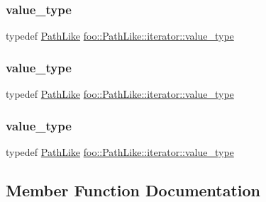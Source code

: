 \subsubsection{\texorpdfstring{value\_type}{value\_type}\hspace{0.1cm}{\footnotesize\ttfamily [1/3]}}
{\footnotesize\ttfamily typedef \mbox{\hyperlink{classfoo_1_1_path_like}{Path\+Like}} \mbox{\hyperlink{structfoo_1_1_path_like_1_1iterator_a797c204878a09e04b23cfe6b48ac7016}{foo\+::\+Path\+Like\+::iterator\+::value\+\_\+type}}}

\mbox{\label{structfoo_1_1_path_like_1_1iterator_a797c204878a09e04b23cfe6b48ac7016}} 
\subsubsection{\texorpdfstring{value\_type}{value\_type}\hspace{0.1cm}{\footnotesize\ttfamily [2/3]}}
{\footnotesize\ttfamily typedef \mbox{\hyperlink{classfoo_1_1_path_like}{Path\+Like}} \mbox{\hyperlink{structfoo_1_1_path_like_1_1iterator_a797c204878a09e04b23cfe6b48ac7016}{foo\+::\+Path\+Like\+::iterator\+::value\+\_\+type}}}

\mbox{\label{structfoo_1_1_path_like_1_1iterator_a797c204878a09e04b23cfe6b48ac7016}} 
\subsubsection{\texorpdfstring{value\_type}{value\_type}\hspace{0.1cm}{\footnotesize\ttfamily [3/3]}}
{\footnotesize\ttfamily typedef \mbox{\hyperlink{classfoo_1_1_path_like}{Path\+Like}} \mbox{\hyperlink{structfoo_1_1_path_like_1_1iterator_a797c204878a09e04b23cfe6b48ac7016}{foo\+::\+Path\+Like\+::iterator\+::value\+\_\+type}}}



\subsection{Member Function Documentation}
\mbox{\label{structfoo_1_1_path_like_1_1iterator_accc280da6edf4fe7c89116878ea781d6}} 
